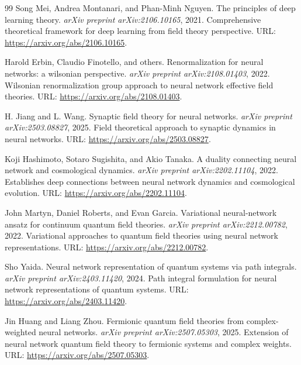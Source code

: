 \documentclass[a4paper]{article}
\theoremstyle{plain}
\theoremstyle{definition}
\theoremstyle{remark}
\begin{document}
\begin{thebibliography}{99}
\label{ref:mei2021principles}
Song Mei, Andrea Montanari, and Phan-Minh Nguyen.
The principles of deep learning theory.
\textit{arXiv preprint arXiv:2106.10165}, 2021.
Comprehensive theoretical framework for deep learning from field theory perspective.
URL: \href{https://arxiv.org/abs/2106.10165}{\url{https://arxiv.org/abs/2106.10165}}.

\label{ref:erbin2022renormalization}
Harold Erbin, Claudio Finotello, and others.
Renormalization for neural networks: a wilsonian perspective.
\textit{arXiv preprint arXiv:2108.01403}, 2022.
Wilsonian renormalization group approach to neural network effective field theories.
URL: \href{https://arxiv.org/abs/2108.01403}{\url{https://arxiv.org/abs/2108.01403}}.

\label{ref:jiang2025synaptic}
H. Jiang and L. Wang.
Synaptic field theory for neural networks.
\textit{arXiv preprint arXiv:2503.08827}, 2025.
Field theoretical approach to synaptic dynamics in neural networks.
URL: \href{https://arxiv.org/abs/2503.08827}{\url{https://arxiv.org/abs/2503.08827}}.

\label{ref:hashimoto2022duality}
Koji Hashimoto, Sotaro Sugishita, and Akio Tanaka.
A duality connecting neural network and cosmological dynamics.
\textit{arXiv preprint arXiv:2202.11104}, 2022.
Establishes deep connections between neural network dynamics and cosmological evolution.
URL: \href{https://arxiv.org/abs/2202.11104}{\url{https://arxiv.org/abs/2202.11104}}.

\label{ref:martyn2022variational}
John Martyn, Daniel Roberts, and Evan Garcia.
Variational neural-network ansatz for continuum quantum field theories.
\textit{arXiv preprint arXiv:2212.00782}, 2022.
Variational approaches to quantum field theories using neural network representations.
URL: \href{https://arxiv.org/abs/2212.00782}{\url{https://arxiv.org/abs/2212.00782}}.

\label{ref:yaida2024nnqft}
Sho Yaida.
Neural network representation of quantum systems via path integrals.
\textit{arXiv preprint arXiv:2403.11420}, 2024.
Path integral formulation for neural network representations of quantum systems.
URL: \href{https://arxiv.org/abs/2403.11420}{\url{https://arxiv.org/abs/2403.11420}}.

\label{ref:huang2025fermionic}
Jin Huang and Liang Zhou.
Fermionic quantum field theories from complex-weighted neural networks.
\textit{arXiv preprint arXiv:2507.05303}, 2025.
Extension of neural network quantum field theory to fermionic systems and complex weights.
URL: \href{https://arxiv.org/abs/2507.05303}{\url{https://arxiv.org/abs/2507.05303}}.


\end{thebibliography}
\end{document}
